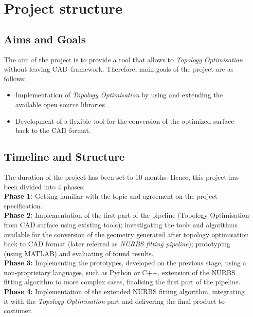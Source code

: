 \section{Project structure}
\subsection{Aims and Goals}
The aim of the project is to provide a tool that allows to \textit{Topology Optimisation} without leaving CAD--framework. Therefore, main goals of the project are as follows:
\begin{itemize}
\item Implementation of \textit{Topology Optimisation} by using and extending the available open source libraries
\item Development of a flexible tool for the conversion of the optimized surface back to the CAD format.
\end{itemize}
\subsection{Timeline and Structure}
The duration of the project has been set to 10 months. Hence, this project has been divided into 4 phases:\\

\textbf{Phase 1:} Getting familiar with the topic and agreement on the project specification.\\

\textbf{Phase 2:} Implementation of the first part of the pipeline (Topology Optimisation from CAD surface using existing tools); investigating the tools and algorithms available for the conversion of the geometry generated after topology optimisation back to CAD format (later referred as \textit{NURBS fitting pipeline}); prototyping (using MATLAB) and evaluating of found results.\\

\textbf{Phase 3:} Implementing the prototypes, developed on the previous stage, using a non-proprietary languages, such as Python or C++, extension of the NURBS fitting algorithm to more complex cases, finalising the first part of the pipeline.\\

\textbf{Phase 4:} Implementation of the extended NURBS fitting algorithm, integrating it with the \textit{Topology Optimisation} part and delivering the final product to costumer.

